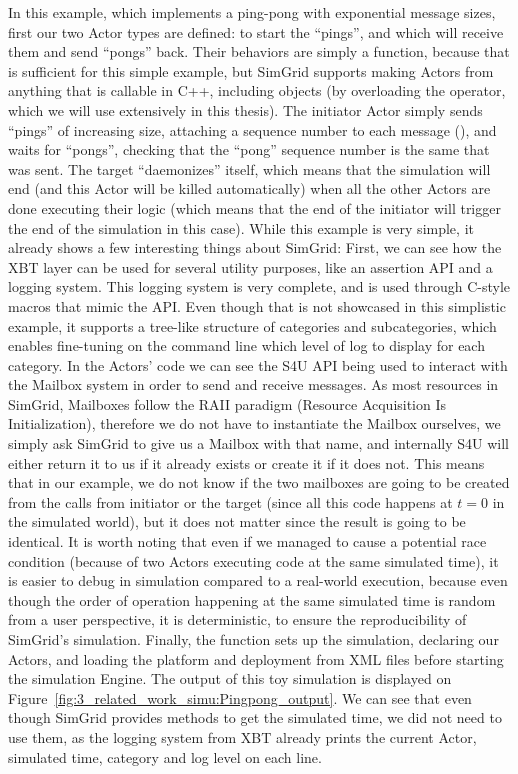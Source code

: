 In this example, which implements a ping-pong with exponential message sizes,
first our two Actor types are defined:  to start the
``pings'', and  which will receive them and send ``pongs'' back.
Their behaviors are simply a function, because that is sufficient for this
simple example, but SimGrid supports making Actors from anything that is
callable in C++, including objects (by overloading the \inline{()} operator,
which we will use extensively in this thesis). The initiator Actor simply sends
``pings'' of increasing size, attaching a sequence number to each message
(), and waits for ``pongs'', checking that the ``pong''
sequence number is the same that was sent. The target ``daemonizes'' itself,
which means that the simulation will end (and this Actor will be killed
automatically) when all the other Actors are done executing their logic (which
means that the end of the initiator will trigger the end of the simulation in
this case). While this example is very simple, it already shows a few
interesting things about SimGrid: First, we can see how the XBT layer can be
used for several utility purposes, like an assertion API and a logging system.
This logging system is very complete, and is used through C-style macros that
mimic the  API. Even though that is not showcased in this
simplistic example, it supports a tree-like structure of categories and
subcategories, which enables fine-tuning on the command line which level of log
to display for each category. In the Actors' code we can see the S4U API being
used to interact with the Mailbox system in order to send and receive messages.
As most resources in SimGrid, Mailboxes follow the RAII paradigm (Resource
Acquisition Is Initialization), therefore we do not have to instantiate the
Mailbox ourselves, we simply ask SimGrid to give us a Mailbox with that name,
and internally S4U will either return it to us if it already exists or create it
if it does not. This means that in our example, we do not know if the two
mailboxes are going to be created from the  calls
from initiator or the target (since all this code happens at $t = 0$ in the
simulated world), but it does not matter since the result is going to be
identical. It is worth noting that even if we managed to cause a potential race
condition (because of two Actors executing code at the same simulated time), it
is easier to debug in simulation compared to a real-world execution, because
even though the order of operation happening at the same simulated time is
random from a user perspective, it is deterministic, to ensure the
reproducibility of SimGrid's simulation. Finally, the  function
sets up the simulation, declaring our Actors, and loading the platform and
deployment from XML files before starting the simulation Engine. The output of
this toy simulation is displayed on
Figure~\ref{fig:3_related_work_simu:Pingpong_output}. We can see that even
though SimGrid provides methods to get the simulated time, we did not need to
use them, as the logging system from XBT already prints the current Actor,
simulated time, category and log level on each line.

